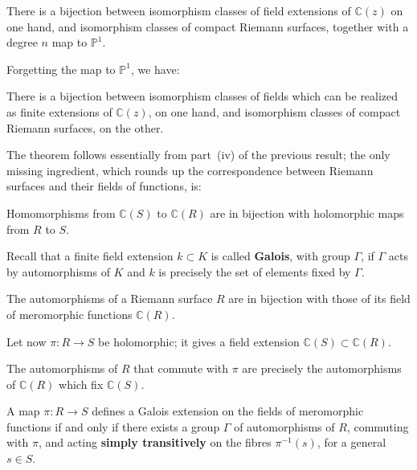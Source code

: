 \documentclass[12pt]{article}
\begin{document}
\begin{theorem}
There is a bijection between isomorphism classes of field extensions of $\mathbb{C}(z)$ on one hand, and isomorphism classes of compact Riemann surfaces, together with a degree $n$ map to $\mathbb{P}^1$.
\end{theorem}

Forgetting the map to $\mathbb{P}^1$, we have:

\begin{theorem}
There is a bijection between isomorphism classes of fields which can be realized as finite extensions of $\mathbb{C}(z)$, on one hand, and isomorphism classes of compact Riemann surfaces, on the other.
\end{theorem}

The theorem follows essentially from part~(iv) of the previous result; the only missing ingredient, which rounds up the correspondence between Riemann surfaces and their fields of functions, is:

\begin{theorem}
Homomorphisms from $\mathbb{C}(S)$ to $\mathbb{C}(R)$ are in bijection with holomorphic maps from $R$ to $S$.
\end{theorem}

\noindent
Recall that a finite field extension $k \subset K$ is called \textbf{Galois}, with group $\Gamma$, if $\Gamma$ acts by automorphisms of $K$ and $k$ is precisely the set of elements fixed by $\Gamma$.

\begin{proposition}
The automorphisms of a Riemann surface $R$ are in bijection with those of its field of meromorphic functions $\mathbb{C}(R)$.
\end{proposition}

Let now $\pi : R \to S$ be holomorphic; it gives a field extension $\mathbb{C}(S) \subset \mathbb{C}(R)$.

\begin{proposition}
The automorphisms of $R$ that commute with $\pi$ are precisely the automorphisms of $\mathbb{C}(R)$ which fix $\mathbb{C}(S)$.
\end{proposition}

\begin{corollary}
A map $\pi : R \to S$ defines a Galois extension on the fields of meromorphic functions if and only if there exists a group $\Gamma$ of automorphisms of $R$, commuting with $\pi$, and acting \textbf{simply transitively} on the fibres $\pi^{-1}(s)$, for a general $s \in S$.
\end{corollary}
\end{document}
